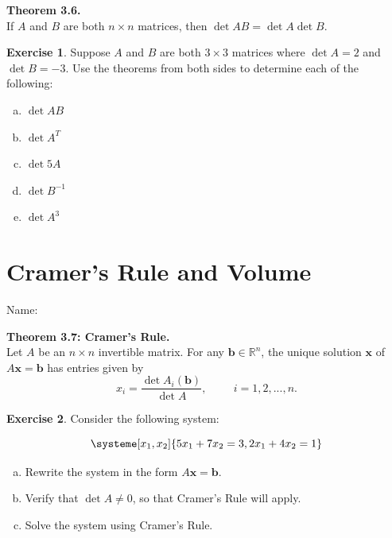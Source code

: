 \documentclass[10pt]{book}
\newcommand{\boxcolor}{gray!30}
\newenvironment{boxthm}{\begin{mdframed}[backgroundcolor=\boxcolor,nobreak=true]}{\end{mdframed}}
\theoremstyle{definition}
\newtheorem{exercise}{Exercise}[section]
\newcommand{\name}[1][2.5in]{\vspace{-2.3em}\hfill Name: \underline{\hspace{#1}}}
\newcommand{\vect}[1]{\ensuremath{\boldsymbol{\mathbf{#1}}}}
\begin{document}
\begin{boxthm}
	\textbf{Theorem 3.6.} \\
	If $A$ and $B$ are both $n \times n$ matrices, then $\det AB = \det A \det B$.
\end{boxthm}

\begin{exercise}
Suppose $A$ and $B$ are both $3 \times 3$ matrices where $\det A = 2$ and $\det B = -3$. Use the theorems from both sides to determine each of the following:

\begin{enumerate}[(a)]

\item $\det AB$

\vfill

\item $\det A^T$

\vfill

\item $\det 5A$

\vfill

\item $\det B^{-1}$

\vfill

\item $\det A^3$

\vfill

\end{enumerate}

\end{exercise}

\newpage

\section{Cramer's Rule and Volume}
\name

\begin{boxthm}
	\textbf{Theorem 3.7: Cramer's Rule.} \\
	Let $A$ be an $n \times n$ invertible matrix. For any $\vect{b} \in \mathbb{R}^n$, the unique solution $\vect{x}$ of $A\vect{x}=\vect{b}$ has entries given by $$x_i = \frac{\det A_i(\vect{b})}{\det A}, \hspace{1cm} i = 1,2,...,n.$$
\end{boxthm}

\begin{exercise}
Consider the following system:

\[\systeme[x_1,x_2]{
	 5x_1	+	7x_2	= 3,
	2x_1	+	4x_2	= 1
	}
\]

\begin{enumerate}[(a)]

\item Rewrite the system in the form $A\vect{x}=\vect{b}$.
\vfill

\item Verify that $\det A \ne 0$, so that Cramer's Rule will apply.
\vfill

\item Solve the system using Cramer's Rule.
\vfill
\vfill
\vfill

\end{enumerate}
\end{exercise}
\end{document}
